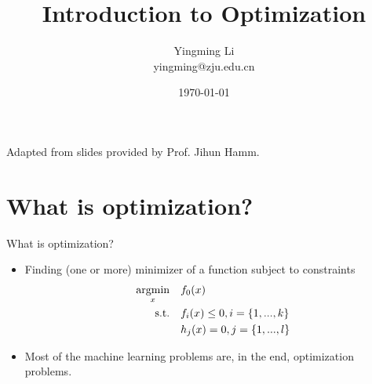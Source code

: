 \documentclass[notes]{beamer}
\title[Opt for ML]{Introduction to Optimization}
\author[YingmingLi]{Yingming Li \\ yingming@zju.edu.cn}
\institute[DSERC, ZJU]{Data Science \& Engineering Research Center, ZJU}
\date[\today]{\today}
\begin{document}



\begin{frame}
	\titlepage
	\begin{center}
		Adapted from slides provided by Prof. Jihun Hamm.		
	\end{center}

\end{frame}

\section{What is optimization?}

\begin{frame}{What is optimization?}
	\begin{itemize}
		\item<1-> Finding (one or more)  minimizer of a function subject to constraints
		      \begin{equation}
			      \begin{aligned}
				      \mathop{\mathrm{argmin}}_x \quad     & f_0(x)                        \\
				      \textrm{s.t.} \quad & f_i(x) \le 0, i = \{1,...,k\} \\
				      \quad               & h_j(x) = 0, j = \{1,...,l\}   \\
			      \end{aligned}
		      \end{equation}
		\item<2-> Most of the machine learning problems are, in the end, optimization problems.
	\end{itemize}
\end{frame}
\end{document}
